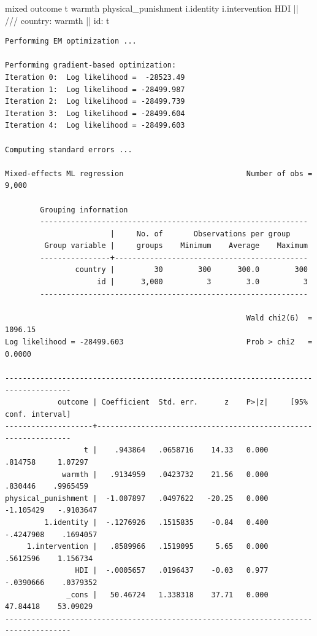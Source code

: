 \documentclass[
  letterpaper,
  DIV=11,
  numbers=noendperiod]{scrreprt}
\newenvironment{Shaded}{\begin{snugshade}}{\end{snugshade}}
\newcommand{\CommentTok}[1]{\textcolor[rgb]{0.37,0.37,0.37}{#1}}
\newcommand{\KeywordTok}[1]{\textcolor[rgb]{0.00,0.23,0.31}{#1}}
\newcommand{\NormalTok}[1]{\textcolor[rgb]{0.00,0.23,0.31}{#1}}
\begin{document}
\begin{Shaded}
\begin{Highlighting}[]
\NormalTok{mixed outcome t warmth physical\_punishment i.}\KeywordTok{identity}\NormalTok{ i.intervention HDI || }\CommentTok{/// }
\NormalTok{country: warmth || id: t}
\end{Highlighting}
\end{Shaded}

\begin{verbatim}
Performing EM optimization ...

Performing gradient-based optimization: 
Iteration 0:  Log likelihood =  -28523.49  
Iteration 1:  Log likelihood = -28499.987  
Iteration 2:  Log likelihood = -28499.739  
Iteration 3:  Log likelihood = -28499.604  
Iteration 4:  Log likelihood = -28499.603  

Computing standard errors ...

Mixed-effects ML regression                            Number of obs =   9,000

        Grouping information
        -------------------------------------------------------------
                        |     No. of       Observations per group
         Group variable |     groups    Minimum    Average    Maximum
        ----------------+--------------------------------------------
                country |         30        300      300.0        300
                     id |      3,000          3        3.0          3
        -------------------------------------------------------------

                                                       Wald chi2(6)  = 1096.15
Log likelihood = -28499.603                            Prob > chi2   =  0.0000

-------------------------------------------------------------------------------------
            outcome | Coefficient  Std. err.      z    P>|z|     [95% conf. interval]
--------------------+----------------------------------------------------------------
                  t |    .943864   .0658716    14.33   0.000      .814758     1.07297
             warmth |   .9134959   .0423732    21.56   0.000      .830446    .9965459
physical_punishment |  -1.007897   .0497622   -20.25   0.000    -1.105429   -.9103647
         1.identity |  -.1276926   .1515835    -0.84   0.400    -.4247908    .1694057
     1.intervention |   .8589966   .1519095     5.65   0.000     .5612596    1.156734
                HDI |  -.0005657   .0196437    -0.03   0.977    -.0390666    .0379352
              _cons |   50.46724   1.338318    37.71   0.000     47.84418    53.09029
-------------------------------------------------------------------------------------


\end{verbatim}
\end{document}
